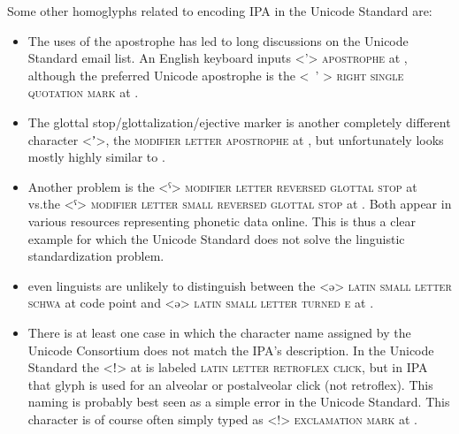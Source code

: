Some other homoglyphs related to encoding IPA in the Unicode Standard are:

\begin{itemize}

  \item The uses of the apostrophe has led to long discussions on the Unicode
     Standard email list. An English keyboard inputs <{'}> \textsc{apostrophe}
     at , although the preferred Unicode apostrophe is the <\ ' >
     \textsc{right single quotation mark} at .
  \item The glottal stop/glottalization/ejective marker is another completely
      different character <{\large ʼ}>, the \textsc{modifier letter apostrophe} at
      , but unfortunately looks mostly highly similar to
      . 
  \item Another problem is the <ˁ> \textsc{modifier letter reversed
     glottal stop} at  vs.\@ the <ˤ> \textsc{modifier
     letter small reversed glottal stop} at . Both 
     appear in various resources representing phonetic data online. This is
     thus a clear example for which the Unicode Standard does not solve the
     linguistic standardization problem.
  \item even linguists are unlikely to distinguish between the <ə>
     \textsc{latin small letter schwa} at code point  and <ǝ>
     \textsc{latin small letter turned e} at .
  \item There is at least one case in which the character name assigned by the
     Unicode Consortium does not match the IPA's description. In the Unicode
     Standard the <ǃ> at  is labeled \textsc{latin letter retroflex
     click}, but in IPA that glyph is used for an alveolar or postalveolar
     click (not retroflex). This naming is probably best seen as a simple
     error in the Unicode Standard. This character is of course often simply
     typed as <!> \textsc{exclamation mark} at .

\end{itemize} 


